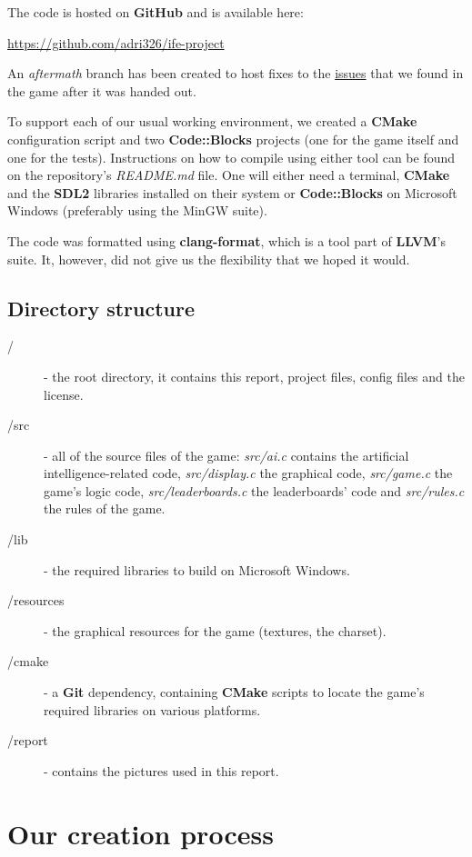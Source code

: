 \documentclass[12pt]{article}
\begin{document}
The code is hosted on \textbf{GitHub} and is available here:

\url{https://github.com/adri326/ife-project}

An \textit{aftermath} branch has been created to host fixes to the \hyperref[issues]{issues} that we found in the game after it was handed out.

To support each of our usual working environment, we created a \textbf{CMake} configuration script and two \textbf{Code::Blocks} projects (one for the game itself and one for the tests).
Instructions on how to compile using either tool can be found on the repository's \textit{README.md} file.
One will either need a terminal, \textbf{CMake} and the \textbf{SDL2} libraries installed on their system or \textbf{Code::Blocks} on Microsoft Windows (preferably using the MinGW suite).

The code was formatted using \textbf{clang-format}, which is a tool part of \textbf{LLVM}'s suite.
It, however, did not give us the flexibility that we hoped it would.

\subsection{Directory structure}

\begin{description}
\item[/] - the root directory, it contains this report, project files, config files and the license.
\item[/src] - all of the source files of the game: \textit{src/ai.c} contains the artificial intelligence-related code, \textit{src/display.c} the graphical code, \textit{src/game.c} the game's logic code, \textit{src/leaderboards.c} the leaderboards' code and \textit{src/rules.c} the rules of the game.
\item[/lib] - the required libraries to build on Microsoft Windows.
\item[/resources] - the graphical resources for the game (textures, the charset).
\item[/cmake] - a \textbf{Git} dependency, containing \textbf{CMake} scripts to locate the game's required libraries on various platforms.
\item[/report] - contains the pictures used in this report.
\end{description}

\section{Our creation process}
\end{document}
